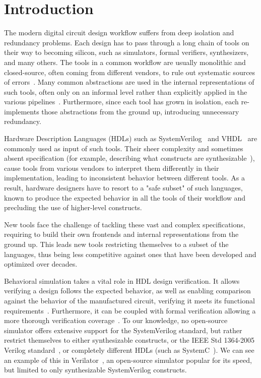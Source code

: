 \chapter{Introduction}
\label{ch:intro}
The modern digital circuit design workflow suffers from deep isolation and redundancy problems. Each design has to pass through a long chain of tools on their way to becoming silicon, such as simulators, formal verifiers, synthesizers, and many others. The tools in a common workflow are usually monolithic and closed-source, often coming from different vendors, to rule out systematic sources of errors~\cite{Schuiki2020}. Many common abstractions are used in the internal representations of such tools, often only on an informal level rather than explicitly applied in the various pipelines~\cite{Neuendorffer}. Furthermore, since each tool has grown in isolation, each re-implements those abstractions from the ground up, introducing unnecessary redundancy.

Hardware Description Languages (HDLs) such as SystemVerilog~\cite{SV2018} and VHDL~\cite{VHDL2009} are commonly used as input of such tools. Their sheer complexity and sometimes absent specification (for example, describing what constructs are synthesizable~\cite{Sutherland2006APF}), cause tools from various vendors to interpret them differently in their implementation, leading to inconsistent behavior between different tools. As a result, hardware designers have to resort to a "safe subset" of such languages, known to produce the expected behavior in all the tools of their workflow and precluding the use of higher-level constructs.

New tools face the challenge of tackling these vast and complex specifications, requiring to build their own frontends and internal representations from the ground up. This leads new tools restricting themselves to a subset of the languages, thus being less competitive against ones that have been developed and optimized over decades.

Behavioral simulation takes a vital role in HDL design verification. It allows verifying a design follows the expected behavior, as well as enabling comparison against the behavior of the manufactured circuit, verifying it meets its functional requirements~\cite{Ashenden1994}. Furthermore, it can be coupled with formal verification allowing a more thorough verification coverage~\cite{YuanLu2001}. To our knowledge, no open-source simulator offers extensive support for the SystemVerilog standard, but rather restrict themselves to either synthesizable constructs, or the IEEE Std 1364-2005 Verilog standard~\cite{V2006}, or completely different HDLs (such as SystemC~\cite{systemc}). We can see an example of this in Verilator~\cite{verilator}, an open-source simulator popular for its speed, but limited to only synthesizable SystemVerilog constructs.

